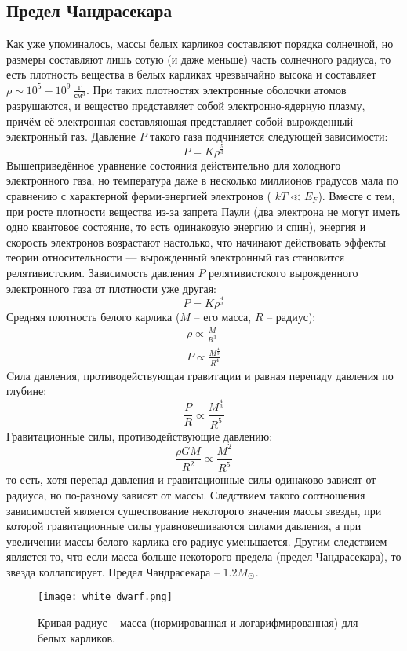 \subsection{Предел Чандрасекара}
Как уже упоминалось, массы белых карликов составляют порядка солнечной, но размеры составляют лишь сотую (и даже меньше) часть солнечного радиуса, то есть плотность вещества в белых карликах чрезвычайно высока и составляет $\rho \sim 10^{5}-10^{9} \ \frac{\text{г}}{\text{см}^{3}} $. При таких плотностях электронные оболочки атомов разрушаются, и вещество представляет собой электронно-ядерную плазму, причём её электронная составляющая представляет собой вырожденный электронный газ. Давление $P$ такого газа подчиняется следующей зависимости:
\begin{equation*}
    P = K\rho^{\frac{5}{3}}
\end{equation*}
Вышеприведённое уравнение состояния действительно для холодного электронного газа, но температура даже в несколько миллионов градусов мала по сравнению с характерной ферми-энергией электронов (
$kT\ll E_{F}$). Вместе с тем, при росте плотности вещества из-за запрета Паули (два электрона не могут иметь одно квантовое состояние, то есть одинаковую энергию и спин), энергия и скорость электронов возрастают настолько, что начинают действовать эффекты теории относительности — вырожденный электронный газ становится релятивистским. Зависимость давления $P$ релятивистского вырожденного электронного газа от плотности уже другая:
\begin{equation*}
    P = K\rho^{\frac{4}{3}}
\end{equation*}
Средняя плотность белого карлика ($M$ -- его масса, $R$ -- радиус):
\begin{gather*}
    \rho \propto \frac{M}{R^{3}}\\
    P\propto \frac{M^{\frac{4}{3}}}{R^{4}}
\end{gather*}
Cила давления, противодействующая гравитации и равная перепаду давления по глубине:
\begin{equation*}
    \frac{P}{R}\propto \frac{M^{\frac{4}{3}}}{R^{5}}
\end{equation*}
Гравитационные силы, противодействующие давлению:
\begin{equation*}
    \frac{\rho G M}{R^{2}} \propto \frac{M^{2}}{R^{5}}
\end{equation*}
то есть, хотя перепад давления и гравитационные силы одинаково зависят от радиуса, но по-разному зависят от массы. Следствием такого соотношения зависимостей является существование некоторого значения массы звезды, при которой гравитационные силы уравновешиваются силами давления, а при увеличении массы белого карлика его радиус уменьшается. Другим следствием является то, что если масса больше некоторого предела (предел Чандрасекара), то звезда коллапсирует. Предел Чандрасекара -- $1.2M_{\Sun}$. 
\begin{figure}[H]
    \centering
    \texttt{[image: white\_dwarf.png]}
    \caption{Кривая радиус -- масса (нормированная и логарифмированная) для белых карликов.}
    \label{fig:my_label}
\end{figure}
